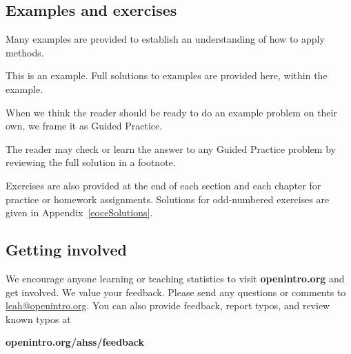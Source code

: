 \vspace{3mm}

\subsection*{{\color{oiB}Examples and exercises}}

\noindent%
Many examples are provided to establish an understanding of how
to apply methods.

\begin{examplewrap}
\begin{nexample}{This is an example.}
  Full solutions to examples are provided here, within the example.
\end{nexample}
\end{examplewrap}

\noindent%
When we think the reader should be ready to do an example problem on their own, we frame it as Guided Practice.

\begin{exercisewrap}
\begin{nexercise}
The reader may check or learn the answer to any Guided Practice
problem by reviewing the full solution in a footnote.\footnotemark{}
\end{nexercise}
\end{exercisewrap}

\noindent%
Exercises are also provided at the end of each section
and each chapter for practice or homework assignments.  
Solutions for odd-numbered exercises are given in
Appendix~\ref{eoceSolutions}.

\subsection*{{\color{oiB}Getting involved}}
We encourage anyone learning or teaching statistics to visit
    {\color{black}\textbf{openintro.org}}
and get involved.
We value your feedback.
Please send any questions or comments to \href{mailto:leah@openintro.org}{leah@openintro.org}.  You can also provide feedback, report typos, and review known typos at
\begin{center}
    {\color{black}\textbf{openintro.org/ahss/feedback}}
\end{center}


